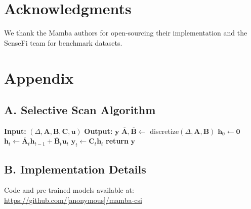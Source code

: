\documentclass[10pt,conference]{IEEEtran}
\begin{document}
\section*{Acknowledgments}

We thank the Mamba authors for open-sourcing their implementation and the SenseFi team for benchmark datasets.




\section*{Appendix}

\subsection*{A. Selective Scan Algorithm}

\begin{algorithmic}
\STATE \textbf{Input:} $(\Delta, \mathbf{A}, \mathbf{B}, \mathbf{C}, \mathbf{u})$
\STATE \textbf{Output:} $\mathbf{y}$
\STATE $\overline{\mathbf{A}}, \overline{\mathbf{B}} \gets$ discretize$(\Delta, \mathbf{A}, \mathbf{B})$
\STATE $\mathbf{h}_0 \gets \mathbf{0}$
    \STATE $\mathbf{h}_t \gets \overline{\mathbf{A}}_t \mathbf{h}_{t-1} + \overline{\mathbf{B}}_t \mathbf{u}_t$
    \STATE $\mathbf{y}_t \gets \mathbf{C}_t \mathbf{h}_t$
\ENDFOR
\STATE \textbf{return} $\mathbf{y}$
\end{algorithmic}

\subsection*{B. Implementation Details}

Code and pre-trained models available at: \url{https://github.com/[anonymous]/mamba-csi}
\end{document}
